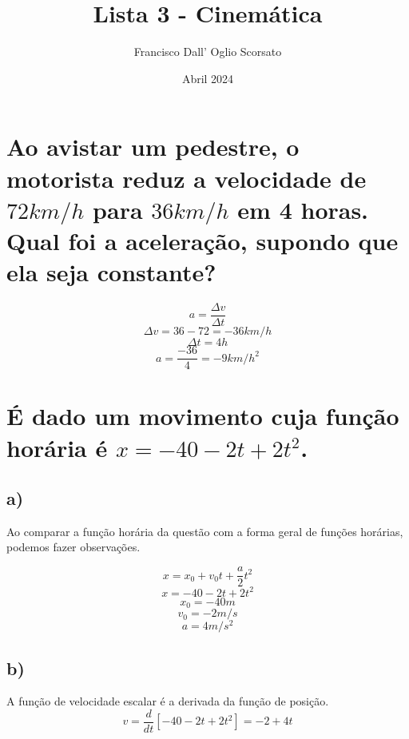 \documentclass{article}
\title{Lista 3 - Cinemática}
\author{Francisco Dall' Oglio Scorsato}
\date{Abril 2024}
\begin{document}
\maketitle

\section{Ao avistar um pedestre, o motorista reduz a velocidade de \(72km/h\) para \(36km/h\) em 4 horas. Qual foi a aceleração, supondo que ela seja constante?}

    \[a=\frac{\Delta v}{\Delta t}\]
    \[\Delta v=36-72=-36km/h\]
    \[\Delta t=4h\]
    \[a=\frac{-36}{4}=-9km/h^2\] 

\section{É dado um movimento cuja função horária é \(x=-40-2t+2t^2\).}


    \subsection{a)}
        \hspace{\parindent}Ao comparar a função horária da questão com a forma geral de funções horárias, podemos fazer observações.
    
        \[x=x_0+v_0t+\frac{a}{2}t^2\]
        \[x=-40-2t+2t^2\]
        \[x_0=-40m\]
        \[v_0=-2m/s\]
        \[a=4m/s^2\]
    
    \subsection{b)}
        \hspace{\parindent}A função de velocidade escalar é a derivada da função de posição.
        \[v = \frac{d}{dt}[-40-2t+2t^2]=-2+4t\]
    
\end{document}
